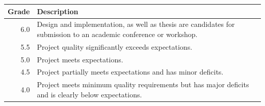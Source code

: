 \documentclass[a4paper, 12pt, DIV=15]{scrartcl}
\begin{document}
\begin{center}
\begin{tabular}{rm{}}
\toprule
\bfseries Grade & \bfseries Description \\
\midrule
6.0 &  Design and implementation, as well as thesis are candidates for submission to
    an academic conference or workshop. \\ \midrule
5.5 &  Project quality significantly exceeds expectations. \\ \midrule
5.0 &  Project meets expectations. \\ \midrule
4.5 &  Project partially meets expectations and has minor deficits. \\ \midrule
4.0 &  Project meets minimum quality requirements but has major deficits and
        is clearly below expectations. \\
\bottomrule
\end{tabular}
\end{center}


\begin{small}
  
\end{small}
\end{document}
